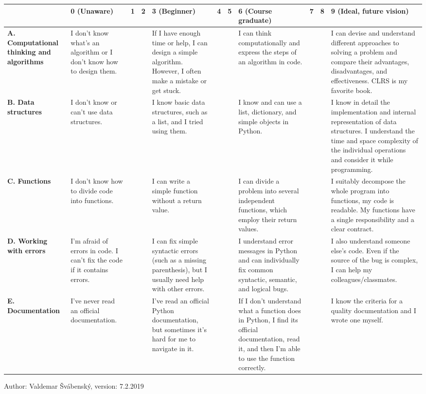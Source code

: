 \documentclass{article}
\begin{document}
\begin{table}[H]
\centering
\begin{tabular}{|p{3.2cm}|p{2.5cm}|l|l|p{4.5cm}|l|l|p{4.5cm}|l|l|p{4.5cm}|}
\hline
& 0 (Unaware) & 1 & 2 & 3 (Beginner) & 4 & 5 & 6 (Course graduate) & 7 & 8 & 9 (Ideal, future vision) \\ \hline

\textbf{A. Computational thinking and algorithms}
& I don't know what's an algorithm or I don't know how to design them. & &
& If I have enough time or help, I can design a simple algorithm. However, I often make a mistake or get stuck. & & 
& I can think computationally and express the steps of an algorithm in code. & & 
& I can devise and understand different approaches to solving a problem and compare their advantages, disadvantages, and effectiveness. CLRS is my favorite book. \\ \hline

\textbf{B. Data structures}
& I don't know or can't use data structures. & &
& I know basic data structures, such as a list, and I tried using them. & & 
& I know and can use a list, dictionary, and simple objects in Python. & & 
& I know in detail the implementation and internal representation of data structures. I understand the time and space complexity of the individual operations and consider it while programming. \\ \hline

\textbf{C. Functions}
& I don't know how to divide code into functions. & &
& I can write a simple function without a return value. & & 
& I can divide a problem into several independent functions, which employ their return values. & & 
& I suitably decompose the whole program into functions, my code is readable. My functions have a single responsibility and a clear contract. \\ \hline

\textbf{D. Working with errors}
& I'm afraid of errors in code. I can't fix the code if it contains errors. & &
& I can fix simple syntactic errors (such as a missing parenthesis), but I usually need help with other errors. & & 
& I understand error messages in Python and can individually fix common syntactic, semantic, and logical bugs. & & 
& I also understand someone else's code. Even if the source of the bug is complex, I can help my colleagues/classmates. \\ \hline

\textbf{E. Documentation}
& I've never read an official documentation. & &
& I've read an official Python documentation, but sometimes it's hard for me to navigate in it. & & 
& If I don't understand what a function does in Python, I find its official documentation, read it, and then I'm able to use the function correctly. & & 
& I know the criteria for a quality documentation and I wrote one myself. \\ \hline
\end{tabular}
\end{table}

\vfill
\begin{center}
\small Author: Valdemar Švábenský, version: 7.2.2019
\end{center}
\end{document}
